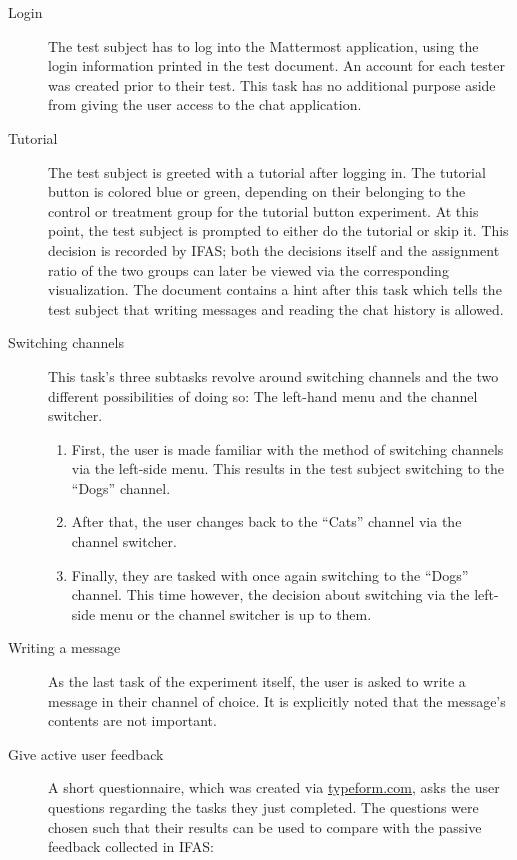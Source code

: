 \begin{description}

\item [Login] The test subject has to log into the Mattermost application, using the login information printed in the test document.
An account for each tester was created prior to their test.
This task has no additional purpose aside from giving the user access to the chat application.

\item [Tutorial] The test subject is greeted with a tutorial after logging in.
The tutorial button is colored blue or green, depending on their belonging to the control or treatment group for the tutorial button experiment.
At this point, the test subject is prompted to either do the tutorial or skip it.
This decision is recorded by \ac{IFAS}; both the decisions itself and the assignment ratio of the two groups can later be viewed via the corresponding visualization.
The document contains a hint after this task which tells the test subject that writing messages and reading the chat history is allowed.

\item [Switching channels] This task's three subtasks revolve around switching channels and the two different possibilities of doing so: The left-hand menu and the channel switcher.

\begin{enumerate}
\item First, the user is made familiar with the method of switching channels via the left-side menu.
This results in the test subject switching to the ``Dogs'' channel.
\item After that, the user changes back to the ``Cats'' channel via the channel switcher.
\item Finally, they are tasked with once again switching to the ``Dogs'' channel.
This time however, the decision about switching via the left-side menu or the channel switcher is up to them.
\end{enumerate}

\item [Writing a message] As the last task of the experiment itself, the user is asked to write a message in their channel of choice.
It is explicitly noted that the message's contents are not important.

\item [Give active user feedback] A short questionnaire, which was created via \url{typeform.com}, asks the user questions regarding the tasks they just completed.
The questions were chosen such that their results can be used to compare with the passive feedback collected in \ac{IFAS}:


\end{description}
